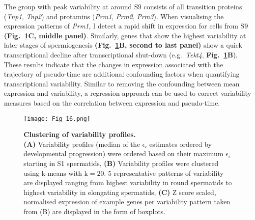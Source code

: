 The group with peak variability at around S9 consists of all transition proteins (\textit{Tnp1}, \textit{Tnp2}) and protamins (\textit{Prm1}, \textit{Prm2}, \textit{Prm3}). When visualising the expression patterns of \textit{Prm1}, I detect a rapid shift in expression for cells from S9 \textbf{(Fig.~\ref{fig3:variability_clustering}C, middle panel)}. Similarly, genes that show the highest variability at later stages of spermiogenesis \textbf{(Fig.~\ref{fig3:variability_clustering}B, second to last panel)} show a quick transcriptional decline after transcriptional shut-down (e.g.~\emph{Tekt4}, \textbf{Fig.~\ref{fig3:variability_clustering}B}). \\

These results indicate that the changes in expression associated with the trajectory of pseudo-time are additional confounding factors when quantifying transcriptional variability. Similar to removing the confounding between mean expression and variability, a regression approach can be used to correct variability measures based on the correlation between expression and pseudo-time. 

\newpage

\begin{figure}[!h]
\centering
\texttt{[image: Fig\_16.png]}
\caption[Clustering of variability profiles]{\textbf{Clustering of variability profiles.}\\
\textbf{(A)} Variability profiles (median of the $\epsilon_i$ estimates ordered by developmental progression) were ordered based on their maximum $\epsilon_i$ starting in S1 spermatids, \textbf{(B)} Variability profiles were clustered using k-means with $\text{k}=20$. 5 representative patterns of variability are displayed ranging from highest variability in round spermatids to highest variability in elongating spermatids, \textbf{(C)} Z score scaled, normalised expression of example genes per variability pattern taken from (B) are displayed in the form of boxplots.}
\label{fig3:variability_clustering}
\end{figure}
